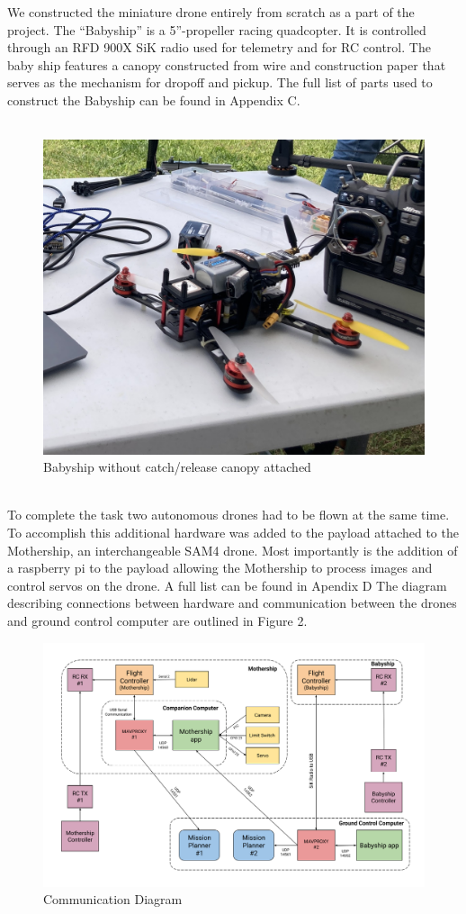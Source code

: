\documentclass[11pt]{article}
\begin{document}
We constructed the miniature drone entirely from scratch as a part of the project. The “Babyship” is a 5”-propeller racing quadcopter. It is controlled through an RFD 900X SiK radio used for telemetry and for RC control. The baby ship features a canopy constructed from wire and construction paper that serves as the mechanism for dropoff and pickup. The full list of parts used to construct the Babyship can be found in Appendix C.\\\\
\begin{figure}[htp]
    \centering
    \includegraphics[scale=0.15]{Babyship.png}
    \caption{Babyship without catch/release canopy attached}
\end{figure}\\
\noindent
To complete the task two autonomous drones had to be flown at the same time. To accomplish this additional hardware was added to the payload attached to the Mothership, an interchangeable SAM4 drone. Most importantly is the addition of a raspberry pi to the payload allowing the Mothership to process images and control servos on the drone. A full list can be found in Apendix D The diagram describing connections between hardware and communication between the drones and ground control computer are outlined in Figure 2.
\begin{figure}[htp]
    \centering
    \includegraphics[scale=0.3]{Communication_Diagram.png}
    \caption{Communication Diagram}
\end{figure}
\end{document}
